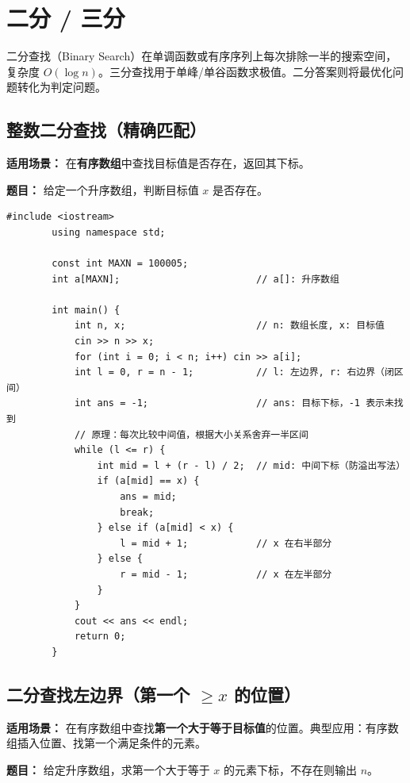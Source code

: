 \documentclass[12pt,a4paper]{ctexart}
\begin{document}
	\newpage
	
	\section{二分 / 三分}
	二分查找（Binary Search）在单调函数或有序序列上每次排除一半的搜索空间，复杂度 $O(\log n)$。三分查找用于单峰/单谷函数求极值。二分答案则将最优化问题转化为判定问题。
	
	\subsection{整数二分查找（精确匹配）}
	\textbf{适用场景：} 在\textbf{有序数组}中查找目标值是否存在，返回其下标。
	
	\textbf{题目：} 给定一个升序数组，判断目标值 $x$ 是否存在。
	
	\begin{lstlisting}[caption={整数二分——查找目标值}]
		#include <iostream>
		using namespace std;
		
		const int MAXN = 100005;
		int a[MAXN];                        // a[]: 升序数组
		
		int main() {
			int n, x;                       // n: 数组长度, x: 目标值
			cin >> n >> x;
			for (int i = 0; i < n; i++) cin >> a[i];
			int l = 0, r = n - 1;           // l: 左边界, r: 右边界（闭区间）
			int ans = -1;                   // ans: 目标下标，-1 表示未找到
			// 原理：每次比较中间值，根据大小关系舍弃一半区间
			while (l <= r) {
				int mid = l + (r - l) / 2;  // mid: 中间下标（防溢出写法）
				if (a[mid] == x) {
					ans = mid;
					break;
				} else if (a[mid] < x) {
					l = mid + 1;            // x 在右半部分
				} else {
					r = mid - 1;            // x 在左半部分
				}
			}
			cout << ans << endl;
			return 0;
		}
	\end{lstlisting}
	
	\subsection{二分查找左边界（第一个 $\ge x$ 的位置）}
	\textbf{适用场景：} 在有序数组中查找\textbf{第一个大于等于目标值}的位置。典型应用：有序数组插入位置、找第一个满足条件的元素。
	
	\textbf{题目：} 给定升序数组，求第一个大于等于 $x$ 的元素下标，不存在则输出 $n$。
	
\end{document}

